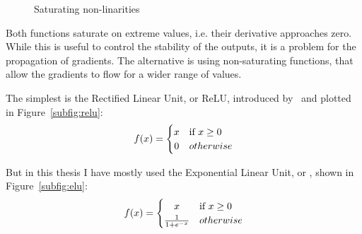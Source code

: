 \begin{figure}[tb]
	\hfil
	\caption{Saturating non-linarities}\label{fig:non_linear}
\end{figure}

Both functions saturate on extreme values, 
i.e. their derivative approaches zero.
While this is useful to control the stability of the outputs, it is a problem for the propagation of gradients.
The alternative is using non-saturating functions, that allow the gradients to flow for a wider range of values.

The simplest is the Rectified Linear Unit, or ReLU, introduced by~\citet{relu} and plotted in Figure~\ref{subfig:relu}:
\begin{equation*}
f(x) =  \begin{cases}
\hfil x &  \text{if } x \geq 0 \\
\hfil 0 & otherwise
\end{cases}
\end{equation*}

But in this thesis I have mostly used the Exponential Linear Unit, or \ELU, shown in Figure~\ref{subfig:elu}:
\begin{equation*}
f(x) =  \begin{cases}
\hfil x &  \text{if } x \geq 0 \\
\frac{1}{1 + e^{-x}} & otherwise
\end{cases}
\end{equation*}

